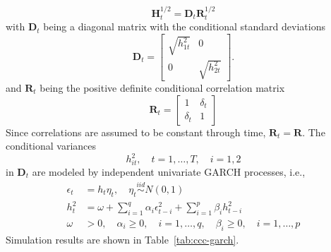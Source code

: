 \documentclass{article}
\begin{document}
\begin{equation}
\boldsymbol{H}_{t}^{1/2} = \boldsymbol{D}_{t} \boldsymbol{R}_{t}^{1 / 2}
\end{equation}
with $\boldsymbol{D}_{t}$ being a diagonal matrix with the conditional standard deviations 
\begin{equation}
\label{eqn:40}
\boldsymbol{D}_{t}=\left[\begin{array}{cc}{\sqrt{h_{1 t}^{2}}} & {0} \\ {0} & {\sqrt{h_{2 t}^{2}}}\end{array}\right].
\end{equation}
and $\boldsymbol{R}_{t}$ being the positive definite conditional correlation matrix 
\begin{equation}
\boldsymbol{R}_{t}=\left[\begin{array}{cc}{1} & {\delta_{ t}} \\ {\delta_{ t}} & {1}\end{array}\right]
\end{equation}
Since correlations are assumed to be constant through time, $\boldsymbol{R}_{t}=\boldsymbol{R}$. The conditional variances 
$${h}_{i t}^{2}, \quad t=1, \ldots, T, \quad i=1, 2$$
in $\boldsymbol{D}_{t}$ are modeled by independent univariate GARCH processes, i.e.,
\begin{equation}
\label{eqn:garch}
\begin{aligned} \epsilon_{t} &=h_{t} \eta_{t}, \quad \eta_{t} \stackrel{i i d}{\sim}N(0,1) \\ h_{t}^{2} &=\omega+\sum_{i=1}^{q} \alpha_{i} \epsilon_{t-i}^{2}+\sum_{i=1}^{p} \beta_{i} h_{t-i}^{2} \\ \omega &>0, \quad \alpha_{i} \geq 0, \quad i=1, \ldots, q, \quad \beta_{i} \geq 0, \quad i=1, \ldots, p \end{aligned}
\end{equation}
Simulation results are shown in Table~\vref{tab:ccc-garch}.
\end{document}
